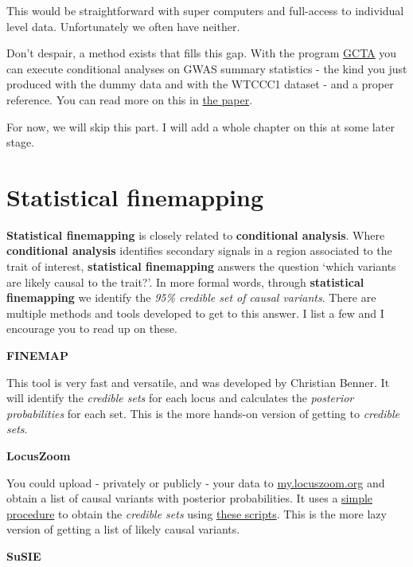 \documentclass[
]{book}
\begin{document}
This would be straightforward with super computers and full-access to individual level data. Unfortunately we often have neither.

Don't despair, a method exists that fills this gap. With the program \href{http://cnsgenomics.com/software/gcta/\#Overview}{GCTA} you can execute conditional analyses on GWAS summary statistics - the kind you just produced with the dummy data and with the WTCCC1 dataset - and a proper reference. You can read more on this in \href{https://www.nature.com/articles/ng.2213}{the paper}.

For now, we will skip this part. I will add a whole chapter on this at some later stage.

\hypertarget{statistical-finemapping}{%
\section{Statistical finemapping}\label{statistical-finemapping}}

\textbf{Statistical finemapping} is closely related to \textbf{conditional analysis}. Where \textbf{conditional analysis} identifies secondary signals in a region associated to the trait of interest, \textbf{statistical finemapping} answers the question `which variants are likely causal to the trait?'. In more formal words, through \textbf{statistical finemapping} we identify the \emph{95\% credible set of causal variants}.
There are multiple methods and tools developed to get to this answer. I list a few and I encourage you to read up on these.

\textbf{FINEMAP}

This tool is very fast and versatile, and was developed by Christian Benner. It will identify the \emph{credible sets} for each locus and calculates the \emph{posterior probabilities} for each set. This is the more hands-on version of getting to \emph{credible sets}.

\textbf{LocusZoom}

You could upload - privately or publicly - your data to \href{https://my.locuszoom.org}{my.locuszoom.org} and obtain a list of causal variants with posterior probabilities. It uses a \href{https://statgen.github.io/gwas-credible-sets/method/locuszoom-credible-sets.pdf}{simple procedure} to obtain the \emph{credible sets} using \href{https://github.com/statgen/gwas-credible-sets/}{these scripts}. This is the more lazy version of getting a list of likely causal variants.

\textbf{SuSIE}
\end{document}
